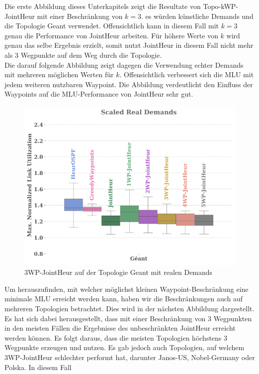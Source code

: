 Die erste Abbildung dieses Unterkapitels zeigt die Resultate von Topo-kWP-JointHeur mit einer Beschränkung von $k = 3$. es würden künstliche Demands und die Topologie Geant verwendet.
Offensichtlich kann in diesem Fall mit $k = 3$ genau die Performance von JointHeur arbeiten. Für höhere Werte von $k$ wird genau das selbe Ergebnis erzielt, somit 
nutzt JointHeur in diesem Fall nicht mehr als 3 Wegpunkte auf dem Weg durch die Topologie. \\
Die darauf folgende Abbildung zeigt dagegen die Verwendung echter Demands mit mehreren möglichen Werten für $k$. Offensichtlich verbessert sich die MLU mit jedem weiteren nutzbaren Waypoint. 
Die Abbildung verdeutlicht den Einfluss der Waypoints auf die MLU-Performance von JointHeur sehr gut. 
\begin{figure}[h]
  \centering
  \includegraphics[width=\linewidth]{abbildungen/realDemtopokwp}
  \caption{3WP-JointHeur auf der Topologie Geant mit realen Demands}
\end{figure}
Um herauszufinden, mit welcher möglichst kleinen Waypoint-Beschränkung eine minimale MLU erreicht werden kann, haben wir die Beschränkungen auch 
auf mehreren Topologien betrachtet. Dies wird in der nächsten Abbildung dargestellt. Es hat sich dabei herausgestellt, dass mit einer Beschränkung von 3 Wegpunkten in den meisten Fällen
die Ergebnisse des unbeschränkten JointHeur erreicht werden können. Es folgt daraus, dass die meisten Topologien höchstens 3 Wegpunkte erzeugen und nutzen.
Es gab jedoch auch Topologien, auf welchem  3WP-JointHeur schlechter performt hat, darunter Janos-US, Nobel-Germany oder Polska. In diesem Fall
